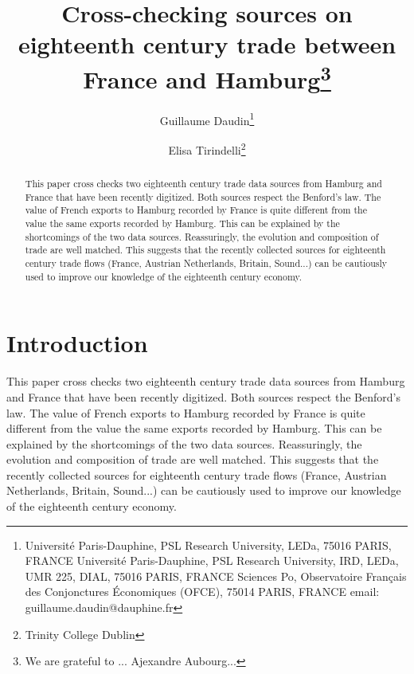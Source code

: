 \documentclass[12pt,a4paper,titlepage,english]{article}
\begin{document}
\title{Cross-checking sources on eighteenth century trade between France and Hamburg\thanks{We are grateful to ... Ajexandre Aubourg...}}
\author{Guillaume Daudin\thanks{
Universit\'{e} Paris-Dauphine, PSL Research University, LEDa, 75016 PARIS, FRANCE \newline
Universit\'{e} Paris-Dauphine, PSL Research University, IRD, LEDa, UMR 225, DIAL, 75016 PARIS, FRANCE \newline
Sciences Po, Observatoire Fran\c{c}ais des Conjonctures \'{E}conomiques (OFCE), 75014 PARIS, FRANCE \newline
email: guillaume.daudin@dauphine.fr}
\and Elisa Tirindelli\thanks{Trinity College Dublin}}




\maketitle

\begin{abstract}
This paper cross checks two eighteenth century trade data sources from Hamburg and France that have been recently digitized.
Both sources respect the Benford's law.
The value of French exports to Hamburg recorded by France is quite different from the value the same exports recorded by Hamburg.
This can be explained by the shortcomings of the two data sources.
Reassuringly, the evolution and composition of trade are well matched.
This suggests that the recently collected sources for eighteenth century trade flows (France, Austrian Netherlands, Britain, Sound...) can be cautiously used to improve our knowledge of the eighteenth century economy.  
\end{abstract}


\section{Introduction}
This paper cross checks two eighteenth century trade data sources from Hamburg and France that have been recently digitized.
Both sources respect the Benford's law.
The value of French exports to Hamburg recorded by France is quite different from the value the same exports recorded by Hamburg.
This can be explained by the shortcomings of the two data sources.
Reassuringly, the evolution and composition of trade are well matched.
This suggests that the recently collected sources for eighteenth century trade flows (France, Austrian Netherlands, Britain, Sound...) can be cautiously used to improve our knowledge of the eighteenth century economy.  
\end{document}
